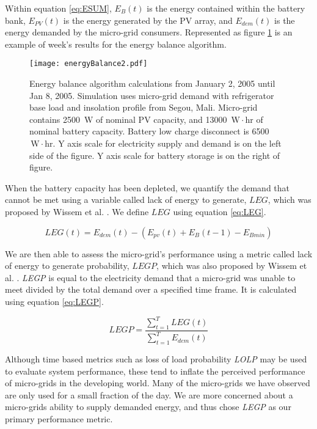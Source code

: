 \documentclass[11p]{article}
\newcommand{\unit}[1]{\ensuremath{\, \mathrm{#1}}}
\begin{document}
Within equation \ref{eq:ESUM}, $E_B(t)$ is the energy contained within the battery bank, $E_{PV}(t)$ is the energy generated by the PV array, and $E_{dem}(t)$ is the energy demanded by the micro-grid consumers.
Represented as figure \ref{energyBalance} is an example of week's results for the energy balance algorithm. 
\begin{figure}[ht] 
  \centering
    \texttt{[image: energyBalance2.pdf]}
  \caption{Energy balance algorithm calculations from January 2, 2005 until Jan 8, 2005.
Simulation uses micro-grid demand with refrigerator base load and insolation profile from Segou, Mali. 
Micro-grid contains 2500 \unit{W} of nominal PV capacity, and 13000 \unit{W\! \cdot \! hr} of nominal battery capacity. 
Battery low charge disconnect is 6500 \unit{W\! \cdot \! hr}. 
Y axis scale for electricity supply and demand is on the left side of the figure.
Y axis scale for battery storage is on the right of figure.}
\label{energyBalance}
\end{figure}
When the battery capacity has been depleted, we quantify the demand that cannot be met using a variable called lack of energy to generate, $LEG$, which was proposed by Wissem et al. \cite{Wissem}. 
We define $LEG$ using equation \ref{eq:LEG}. 

\begin{equation} \label{eq:LEG}
LEG(t) = E_{dem} (t) - (E_{pv} (t)+E_B(t-1)-E_{Bmin})
\end{equation}

We are then able to assess the micro-grid's performance using a metric called lack of energy to generate probability, $LEGP$, which was also proposed by Wissem et al. \cite{Wissem}.
\emph{LEGP} is equal to the electricity demand that a micro-grid was unable to meet divided by the total demand over a specified time frame.
It is calculated using equation \ref{eq:LEGP}.

\begin{equation} \label{eq:LEGP}
LEGP = \frac{\sum_{t=1}^T LEG(t)}{\sum_{t=1}^T E_{dem} (t)}
\end{equation}

Although time based metrics such as loss of load probability \emph{LOLP} may be used to evaluate system performance, these tend to inflate the perceived performance of micro-grids in the developing world.
Many of the micro-grids we have observed are only used for a small fraction of the day.
We are more concerned about a micro-grids ability to supply demanded energy, and thus chose \emph{LEGP} as our primary performance metric.
\end{document}
